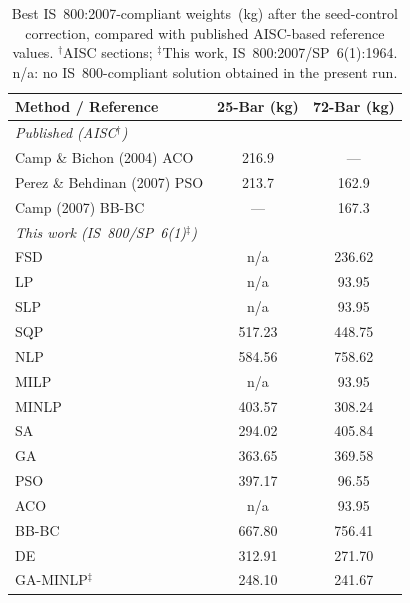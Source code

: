 \begin{table}[tbp]\centering
\caption{Best IS~800:2007-compliant weights~(kg) after the seed-control correction, compared with published AISC-based reference values. $^\dagger$AISC sections; $^\ddagger$This work, IS~800:2007/SP~6(1):1964. n/a: no IS~800-compliant solution obtained in the present run.}
\label{tab:benchmark}
\begin{tabular}{@{}lcc@{}}\toprule
\textbf{Method / Reference} & \textbf{25-Bar (kg)} & \textbf{72-Bar (kg)}\\
\midrule
\textit{Published (AISC$^\dagger$)} & & \\
\quad Camp \& Bichon (2004) ACO & 216.9 & --- \\
\quad Perez \& Behdinan (2007) PSO & 213.7 & 162.9 \\
\quad Camp (2007) BB-BC & --- & 167.3 \\
\midrule
\textit{This work (IS~800/SP~6(1)$^\ddagger$)} & & \\
\quad FSD & n/a & 236.62\\
\quad LP & n/a & 93.95\\
\quad SLP & n/a & 93.95\\
\quad SQP & 517.23 & 448.75\\
\quad NLP & 584.56 & 758.62\\
\quad MILP & n/a & 93.95\\
\quad MINLP & 403.57 & 308.24\\
\quad SA & 294.02 & 405.84\\
\quad GA & 363.65 & 369.58\\
\quad PSO & 397.17 & 96.55\\
\quad ACO & n/a & 93.95\\
\quad BB-BC & 667.80 & 756.41\\
\quad DE & 312.91 & 271.70\\
\quad GA-MINLP$^\ddagger$ & 248.10 & 241.67\\
\bottomrule
\end{tabular}
\end{table}